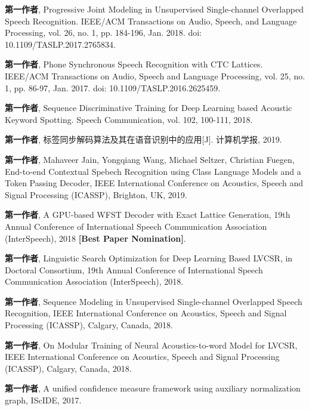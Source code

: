 
\begin{publications}{99}
 \item {\bf 第一作者}, Progressive Joint Modeling in Unsupervised Single-channel Overlapped Speech Recognition. IEEE/ACM Transactions on Audio, Speech, and Language Processing, vol. 26, no. 1, pp. 184-196, Jan. 2018. doi:  10.1109/TASLP.2017.2765834.
 \item {\bf 第一作者}, Phone Synchronous Speech Recognition with CTC Lattices. IEEE/ACM Transactions on Audio, Speech and Language Processing, vol. 25, no. 1, pp. 86-97, Jan. 2017. doi: 10.1109/TASLP.2016.2625459.
  \item {\bf 第一作者}, Sequence Discriminative Training for Deep Learning based Acoustic Keyword Spotting. Speech Communication, vol. 102, 100-111, 2018.
  \item {\bf 第一作者}, 标签同步解码算法及其在语音识别中的应用[J]. 计算机学报, 2019.
 \\
  \item {\bf 第一作者}, Mahaveer Jain, Yongqiang Wang, Michael Seltzer, Christian Fuegen, End-to-end Contextual Spebech Recognition using Class Language Models and a Token Passing Decoder, IEEE International Conference on Acoustics, Speech and Signal Processing (ICASSP), Brighton, UK, 2019.
  \item {\bf 第一作者}, A GPU-based WFST Decoder with Exact Lattice Generation,  19th Annual Conference of  International Speech Communication Association (InterSpeech), 2018 {\bf [Best Paper Nomination]}.
  \item {\bf 第一作者}, Linguistic Search Optimization for Deep Learning Based LVCSR, in Doctoral Consortium, 19th Annual Conference of  International Speech Communication Association (InterSpeech), 2018.
  \item {\bf 第一作者}, Sequence Modeling in Unsupervised Single-channel Overlapped Speech Recognition,  IEEE International Conference on Acoustics, Speech and Signal Processing (ICASSP), Calgary, Canada, 2018.
  \item {\bf 第一作者}, On Modular Training of Neural Acoustics-to-word Model for LVCSR,  IEEE International Conference on Acoustics, Speech and Signal Processing (ICASSP), Calgary, Canada, 2018.
 \item {\bf 第一作者}, A unified confidence measure framework using auxiliary normalization graph, IScIDE, 2017.

\end{publications}
